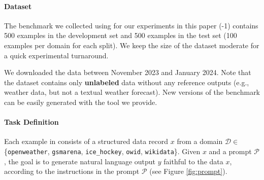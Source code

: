 \paragraph{\benchmark Dataset}
\label{sec:dataset}
The benchmark we collected using \datatool{} for our experiments in this paper (\datatool{}-1) contains 500 examples in the development set and 500 examples in the test set (100 examples per domain for each split). We keep the size of the dataset moderate for a quick experimental turnaround.

We downloaded the data between November 2023 and January 2024. Note that the dataset contains only \textbf{unlabeled} data without any reference outputs (e.g., weather data, but not a textual weather forecast). New versions of the benchmark can be easily generated with the \datatool{} tool we provide.



\paragraph{Task Definition}
Each example in \benchmark consists of a structured data record $x$ from a domain $\mathcal{D} \in $ \{\texttt{openweather}, \texttt{gsmarena}, \texttt{ice\_hockey}, \texttt{owid}, \texttt{wikidata}\}. Given $x$ and a prompt $\mathcal{P}$, the goal is to generate natural language output $y$ faithful to the data $x$, according to the instructions in the prompt $\mathcal{P}$ (see Figure \ref{fig:prompt}).








